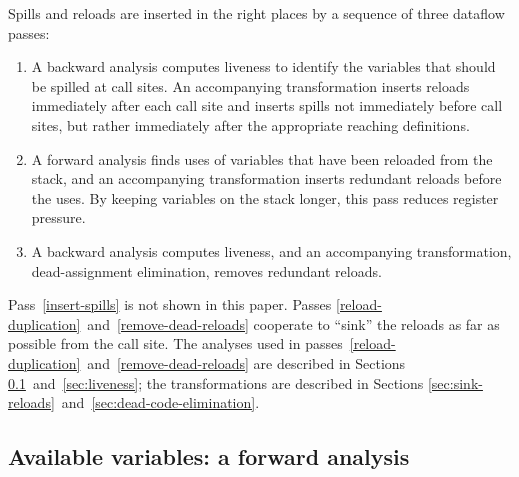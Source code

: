\documentclass[blockstyle,preprint,natbib,nocopyrightspace]{sigplanconf}
\newcommand{\authornote}[1]{{\em #1}}
\def\authornote#1{\unskip\relax}
\newcommand{\simon}[1]{\authornote{SLPJ: #1}}
\newcommand\secreftwo[2]{Sections \ref{sec:#1}~and~\ref{sec:#2}}
\newcommand\seclabel[1]{\label{sec:#1}}
\begin{document}
Spills and reloads are inserted in the right places
by a sequence of three dataflow passes:
\begin{enumerate}
\item
\label{insert-spills}
A backward analysis computes liveness
to identify the variables that should be spilled at call sites.
An accompanying transformation inserts reloads immediately after each call
site and inserts spills not immediately before call sites, but
rather immediately after the appropriate reaching definitions.
\item
\label{reload-duplication}
A forward analysis finds uses of variables that have been reloaded
from the stack, and an accompanying transformation
inserts redundant reloads before the uses.
By keeping variables on the stack longer, this pass reduces register pressure.
\item
\label{remove-dead-reloads}
A backward analysis computes liveness,
and an accompanying transformation, dead-assignment elimination,
removes redundant reloads.
\end{enumerate}
Pass~\ref{insert-spills} is not shown in this paper.
Passes
\ref{reload-duplication}~and~\ref{remove-dead-reloads} cooperate to ``sink''
the reloads as far as possible from the call site.
The analyses used in
passes~\ref{reload-duplication}~and~\ref{remove-dead-reloads}
are described in \secreftwo{avail}{liveness};
the transformations are described in
\secreftwo{sink-reloads}{dead-code-elimination}.



\subsection{Available variables: a forward analysis} 

\seclabel{avail}
\end{document}
